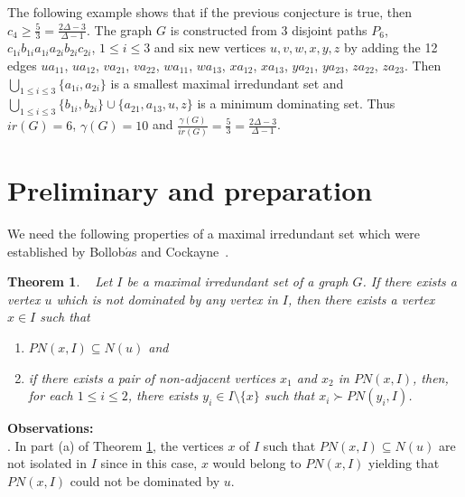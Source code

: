 \documentclass[11pt]{article}
\newtheorem{thm}{Theorem}
\newcommand{\2}{ \vspace{0.2cm} }
\newcommand{\1}{ \vspace{0.1cm} }
\begin{document}
The following example shows that if the previous conjecture is true, then $c_4\ge \frac{5}{3}=\frac{2\Delta -3}{\Delta -1}$.
The graph $G$ is constructed from 3 disjoint paths $P_6$, $c_{1i}b_{1i}a_{1i}a_{2i}b_{2i}c_{2i}$, $1\le i\le 3$ and six new vertices $u,v,w,x,y,z$ by adding the 12 edges $ua_{11}$, $ua_{12}$, $va_{21}$, $va_{22}$, $wa_{11}$, $wa_{13}$, $xa_{12}$, $xa_{13}$, $ya_{21}$, $ya_{23}$, $za_{22}$, $za_{23}$. Then
$\bigcup_{1\le i\le 3}\{a_{1i}, a_{2i}\}$ is a smallest maximal irredundant set and
$\bigcup_{1\le i\le 3}\{b_{1i}, b_{2i}\}\cup \{a_{21},a_{13},u,z\}$ is a minimum dominating set.
Thus $ir(G)=6$, $\gamma(G) =10$ and
$\frac{\gamma(G)}{ir(G)}=\frac{5}{3}=\frac{2\Delta -3}{\Delta -1}$.



















\section{Preliminary and preparation}
\label{S:known}

We need the following properties of a maximal irredundant set which were established by Bollob$\acute{a}$s and Cockayne~\cite{BoCo1979}.

\begin{thm}\label{thm BoCo2}~\cite{BoCo1979}
Let $I$ be a maximal irredundant set of a graph $G$. If there exists a vertex $u$ which is not dominated by any vertex in $I$, then there exists a vertex $x \in I$ such that
\begin{enumerate}
  \item $PN(x, I) \subseteq N(u)$ and
  \item if there exists a pair of non-adjacent vertices
$x_1$ and $x_2$ in $PN(x, I)$, then, for each $1 \leq i \leq 2$, there exists $y_{i} \in I \setminus \{x\}$ such that $x_{i} \succ PN(y_{i}, I)$.
\end{enumerate}
\end{thm}


\noindent
\textbf{Observations:} \\
. In part (a) of Theorem \ref{thm BoCo2}, the vertices $x$ of $I$ such that
$PN(x, I) \subseteq N(u)$ are not isolated in $I$ since in this case, $x$ would belong to $PN(x,I)$ yielding that $PN(x,I)$ could not be dominated by $u$.
\end{document}
